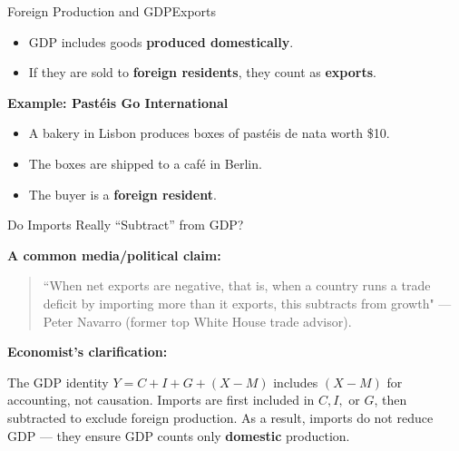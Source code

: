 \documentclass[10pt,aspectratio=169]{beamer}
\begin{document}
\begin{frame}{Foreign Production and GDP}{Exports}

\begin{itemize}
\item GDP includes goods \textbf{produced domestically}.
\item If they are sold to \textbf{foreign residents}, they count as \textbf{exports}.
\end{itemize}

\vspace{0.3cm}
\textbf{Example: Pastéis Go International}

\begin{itemize}
\item A bakery in Lisbon produces boxes of pastéis de nata worth \$10.
\item The boxes are shipped to a café in Berlin.
\item The buyer is a \textbf{foreign resident}.
\end{itemize}

\begin{table}
\end{table}

\end{frame}

\begin{frame}{Do Imports Really “Subtract” from GDP?}

\textbf{A common media/political claim:}
\begin{quote}
``When net exports are negative, that is, when a country runs a trade deficit by importing more than it exports, this subtracts from growth" — Peter Navarro (former top White House trade advisor).
\end{quote}
\vspace{0.3cm}
\textbf{Economist’s clarification:}
\begin{itemize}
    \itemvso The GDP identity \(Y = C + I + G + (X - M)\) includes \((X-M)\) for accounting, not causation.
    \itemvso Imports are first included in \(C, I,\) or \(G\), then subtracted to exclude foreign production.
    \itemvso As a result, imports do not reduce GDP — they ensure GDP counts only \textbf{domestic} production.
\end{itemize}

\end{frame}
\end{document}
